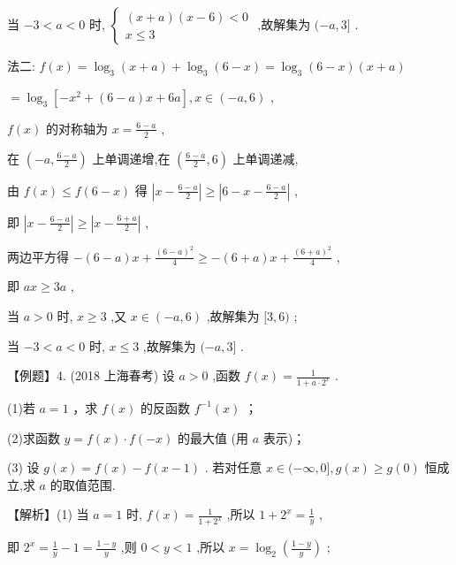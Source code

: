 \documentclass[10pt]{article}
\begin{document}
当 \(- 3 < a < 0\) 时, \(\left\{  \begin{array}{l} \left( {x + a}\right) \left( {x - 6}\right)  < 0 \\  x \leq  3 \end{array}\right.\) ,故解集为 \(( - a,3\rbrack\) .

法二: \(f\left( x\right)  = {\log }_{3}\left( {x + a}\right)  + {\log }_{3}\left( {6 - x}\right)  = {\log }_{3}\left( {6 - x}\right) \left( {x + a}\right)\)

\(= {\log }_{3}\left\lbrack  {-{x}^{2} + \left( {6 - a}\right) x + {6a}}\right\rbrack  ,x \in  \left( {-a,6}\right)\) ,

\(f\left( x\right)\) 的对称轴为 \(x = \frac{6 - a}{2}\) ,

在 \(\left( {-a,\frac{6 - a}{2}}\right)\) 上单调递增,在 \(\left( {\frac{6 - a}{2},6}\right)\) 上单调递减,

由 \(f\left( x\right)  \leq  f\left( {6 - x}\right)\) 得 \(\left| {x - \frac{6 - a}{2}}\right|  \geq  \left| {6 - x - \frac{6 - a}{2}}\right|\) ,

即 \(\left| {x - \frac{6 - a}{2}}\right|  \geq  \left| {x - \frac{6 + a}{2}}\right|\) ,

两边平方得 \(- \left( {6 - a}\right) x + \frac{{\left( 6 - a\right) }^{2}}{4} \geq   - \left( {6 + a}\right) x + \frac{{\left( 6 + a\right) }^{2}}{4}\) ,

即 \({ax} \geq  {3a}\) ,

当 \(a > 0\) 时, \(x \geq  3\) ,又 \(x \in  \left( {-a,6}\right)\) ,故解集为 \(\lbrack 3,6)\) ;

当 \(- 3 < a < 0\) 时, \(x \leq  3\) ,故解集为 \(( - a,3\rbrack\) .

【例题】4. (2018 上海春考) 设 \(a > 0\) ,函数 \(f\left( x\right)  = \frac{1}{1 + a \cdot  {2}^{x}}\) .

(1)若 \(a = 1\) ，求 \(f\left( x\right)\) 的反函数 \({f}^{-1}\left( x\right)\) ；

(2)求函数 \(y = f\left( x\right)  \cdot  f\left( {-x}\right)\) 的最大值 (用 \(a\) 表示)；

(3) 设 \(g\left( x\right)  = f\left( x\right)  - f\left( {x - 1}\right)\) . 若对任意 \(x \in  ( - \infty ,0\rbrack ,g\left( x\right)  \geq  g\left( 0\right)\) 恒成立,求 \(a\) 的取值范围.

【解析】(1) 当 \(a = 1\) 时, \(f\left( x\right)  = \frac{1}{1 + {2}^{x}}\) ,所以 \(1 + {2}^{x} = \frac{1}{y}\) ,

即 \({2}^{x} = \frac{1}{y} - 1 = \frac{1 - y}{y}\) ,则 \(0 < y < 1\) ,所以 \(x = {\log }_{2}\left( \frac{1 - y}{y}\right)\) ;
\end{document}
